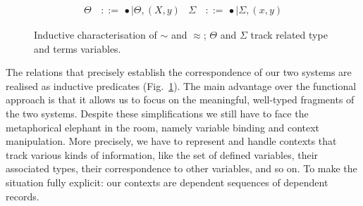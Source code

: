 \documentclass[a4paper,UKenglish]{lipics-v2016}
\newcommand{\ms}{\,}
\newcommand{\mrel}[1]{\mathrel{\ms #1 \ms}}
\newcommand{\bnfdef}{\mrel{::=}}
\newcommand{\of}{\ensuremath{\!:\!}}
\newcommand{\cc}[2]{#1;#2} %
\newcommand{\tyr}{\mathrel{\sim}}
\newcommand{\tmr}{\mathrel{\approx}}
\newcommand{\Prp}{\ensuremath{\textrm{\textasteriskcentered}}}
\newcommand{\nAll}[1]{\ensuremath{\forall #1.\,}}
\newcommand{\Lam}[1]{\ensuremath{\lambda #1.\,}}
\newcommand{\nTyLam}[1]{\ensuremath{\Lambda #1.\,}}
\newcommand{\Prod}[1]{\ensuremath{\Pi #1.\,}}
\newcommand{\emptyctx}{\ensuremath{\bullet}}
\theoremstyle{plain}
\begin{document}
\begin{figure}[t]
  \begin{center}
    \begin{align*}
      \Theta &\bnfdef \emptyctx \mid \Theta, (X,y) & \Sigma &\bnfdef \emptyctx \mid \Sigma, (x,y)
    \end{align*}
  \end{center}
  \caption{Inductive characterisation of $\tyr$ and $\tmr$; $\Theta$ and $\Sigma$ track related type and terms variables.}
  \label{fig:rel}
\end{figure}

The relations that precisely establish the correspondence of our two systems are realised as inductive predicates (Fig.~\ref{fig:rel}).
The main advantage over the functional approach is that it allows us to focus on the meaningful, well-typed fragments of the two systems.
Despite these simplifications we still have to face the metaphorical elephant in the room, namely variable binding and context manipulation.
More precisely, we have to represent and handle contexts that track various kinds of information, like the set of defined variables, their associated types, their correspondence to other variables, and so on.
To make the situation fully explicit: our contexts are dependent sequences of dependent records.
\end{document}
